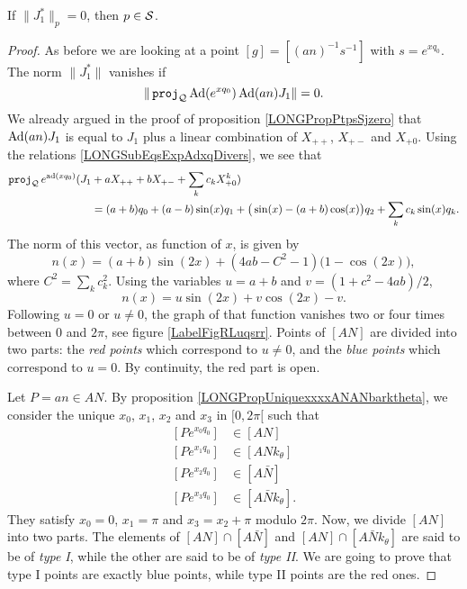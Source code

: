 \begin{proposition}
	If $\| J_1^* \|_p=0$, then $p\in\mathcal{S}$.
\end{proposition}

\begin{proof}
	As before we are looking at a point $[g]=[(an)^{-1}s^{-1}]$ with $s= e^{xq_0}$. The norm $\| J_1^* \|$ vanishes if
	\begin{equation}
		\| \operatorname{\texttt{proj}}_{\mathcal{Q}} \operatorname{Ad}( e^{xq_0})\operatorname{Ad}(an)J_1 \|=0.
	\end{equation}
	We already argued in the proof of proposition \ref{LONGPropPtpsSjzero} that $\operatorname{Ad}(an)J_1$ is equal to $J_1$ plus a linear combination of $X_{++}$, $X_{+-}$ and $X_{+0}$. Using the relations \eqref{LONGSubEqsExpAdxqDivers}, we see that
	\begin{equation}		\label{LONGEqprQexpxqzXanroots}
		\begin{aligned}[]
			\pr_{\sQ} e^{\ad(xq_0)}(J_1&+aX_{++}+bX_{+-}+\sum_k c_kX^k_{+0})\\
								&=(a+b)q_0+(a-b)\sin(x)q_1+\big( \sin(x)-(a+b)\cos(x) \big)q_2+\sum _k c_k\sin(x)q_k.
		\end{aligned}
	\end{equation}
	The norm of this vector, as function of $x$, is given by
	\begin{equation}
		n(x)=(a+b)\sin(2x)+(4ab-C^2-1)\big( 1-\cos(2x) \big),
	\end{equation}
	where $C^2=\sum_kc_k^2$. Using the variables $u=a+b$ and $v=(1+c^2-4ab)/2$,
	\begin{equation}
		n(x)=u\sin(2x)+v\cos(2x)-v.
	\end{equation}
	Following $u=0$ or $u\neq 0$, the graph of that function vanishes two or four times between $0$ and $2\pi$, see figure \ref{LabelFigRLuqsrr}. Points of $[AN]$ are divided into two parts: the \emph{red points} which correspond to $u\neq 0$, and the \emph{blue points} which correspond to $u=0$. By continuity, the red part is open.


\newcommand{\CaptionFigRLuqsrr}{In red, the function $n(x)$ with $u\neq 0$ and in blue, the function with $u=0$.}


	Let $P=an\in AN$. 
	By proposition \ref{LONGPropUniquexxxxANANbarktheta}, we consider the unique  $x_0$, $x_1$, $x_2$ and $x_3$ in $\mathopen[ 0 , 2\pi [$ such that 
\begin{subequations}
	\begin{align}
		[P e^{x_0q_0}]&\in[AN]\\
		[P e^{x_1q_0}]&\in[ANk_{\theta}]\\
		[P e^{x_2q_0}]&\in[A\bar N]\\
		[P e^{x_3q_0}]&\in[A\bar Nk_{\theta}].
	\end{align}
\end{subequations}
They satisfy $x_0=0$, $x_1=\pi$ and $x_3=x_2+\pi$ modulo $2\pi$. Now, we divide $[AN]$ into two parts. The elements of $[AN]\cap [A\bar N]$ and $[AN]\cap[A\bar Nk_{\theta}]$ are said to be of \emph{type I}, while the other are said to be of \emph{type II}. We are going to prove that type I points are exactly blue points, while type II points are the red ones.


\end{proof}
